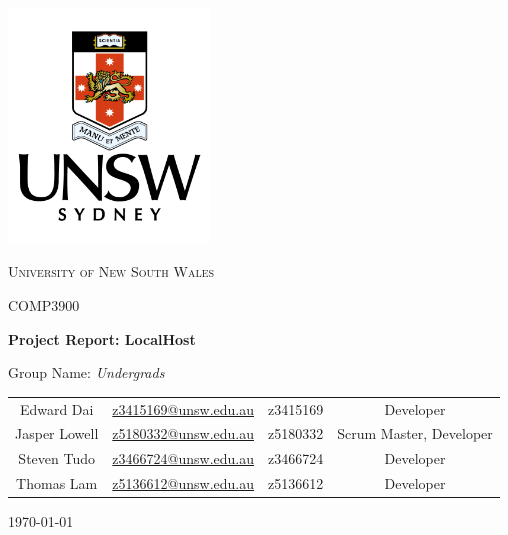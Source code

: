 \documentclass[a4paper,12pt]{article}
\begin{document}
\begin{titlepage}
  \centering \includegraphics[width=0.4\textwidth]{../unsw.png}\par\vspace{1cm}
  {\scshape\LARGE University of New South Wales \par}
  \vspace{0.5cm}
  {\scshape\Large COMP3900 \par}
  \vspace{0.5cm}
  {\huge\bfseries Project Report: LocalHost \par}
  \vspace{1cm}
  {\Large{} Group Name:\itshape{} Undergrads \par}
  \vspace{2cm}
  \begin{center}
    \begin{tabular}{c c c c}
      Edward Dai & \href{mailto:z3415169@unsw.edu.au}{z3415169@unsw.edu.au} &
      z3415169 & Developer \\
      Jasper Lowell & \href{mailto:z5180332@unsw.edu.au}{z5180332@unsw.edu.au} &
      z5180332 & Scrum Master, Developer \\
      Steven Tudo & \href{mailto:z3466724@unsw.edu.au}{z3466724@unsw.edu.au} &
      z3466724 & Developer \\
      Thomas Lam & \href{mailto:z5136612@unsw.edu.au}{z5136612@unsw.edu.au} &
      z5136612 & Developer
    \end{tabular}
  \end{center}
  \vfill
  {\large \today\par}
\end{titlepage}

\setlength{\parindent}{0pt}
\setlength{\parskip}{\baselineskip}

\newpage
\tableofcontents
\newpage



\printbibliography[heading=bibintoc]
\end{document}
